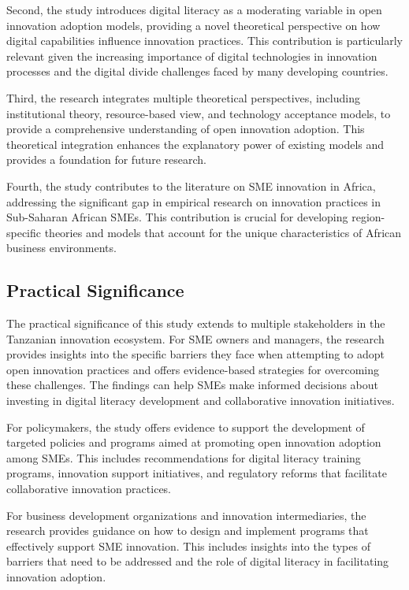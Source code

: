 \documentclass[12pt,a4paper]{article}
\begin{document}
Second, the study introduces digital literacy as a moderating variable in open innovation adoption models, providing a novel theoretical perspective on how digital capabilities influence innovation practices. This contribution is particularly relevant given the increasing importance of digital technologies in innovation processes and the digital divide challenges faced by many developing countries.

Third, the research integrates multiple theoretical perspectives, including institutional theory, resource-based view, and technology acceptance models, to provide a comprehensive understanding of open innovation adoption. This theoretical integration enhances the explanatory power of existing models and provides a foundation for future research.

Fourth, the study contributes to the literature on SME innovation in Africa, addressing the significant gap in empirical research on innovation practices in Sub-Saharan African SMEs. This contribution is crucial for developing region-specific theories and models that account for the unique characteristics of African business environments.

\subsection{Practical Significance}

The practical significance of this study extends to multiple stakeholders in the Tanzanian innovation ecosystem. For SME owners and managers, the research provides insights into the specific barriers they face when attempting to adopt open innovation practices and offers evidence-based strategies for overcoming these challenges. The findings can help SMEs make informed decisions about investing in digital literacy development and collaborative innovation initiatives.

For policymakers, the study offers evidence to support the development of targeted policies and programs aimed at promoting open innovation adoption among SMEs. This includes recommendations for digital literacy training programs, innovation support initiatives, and regulatory reforms that facilitate collaborative innovation practices.

For business development organizations and innovation intermediaries, the research provides guidance on how to design and implement programs that effectively support SME innovation. This includes insights into the types of barriers that need to be addressed and the role of digital literacy in facilitating innovation adoption.
\end{document}
